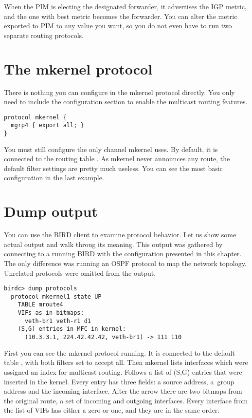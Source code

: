 When the PIM is electing the designated forwarder, it advertises the IGP metric, and
the one with best metric becomes the forwarder. You can alter the metric
exported to PIM to any value you want, so you do not even have to run two
separate routing protocols.

\section{The mkernel protocol}

There is nothing you can configure in the mkernel protocol directly. You only
need to include the configuration section to enable the multicast routing
features.

\begin{lstlisting}
protocol mkernel {
  mgrp4 { export all; }
}
\end{lstlisting}

\noindent You must still configure the only channel mkernel uses. By default, it
is connected to the routing table . As mkernel never announces any
route, the default filter settings are pretty much useless. You can see the
most basic configuration in the last example.

\section{Dump output}
You can use the BIRD client to examine protocol behavior. Let us show some
actual output and walk throug its meaning. This output was gathered by
connecting to a running BIRD with the configuration presented in this chapter.
The only difference was running an OSPF protocol to map the network topology.
Unrelated protocols were omitted from the output.

\begin{lstlisting}
birdc> dump protocols
  protocol mkernel1 state UP
    TABLE mroute4
    VIFs as in bitmaps:
      veth-br1 veth-r1 d1
    (S,G) entries in MFC in kernel:
      (10.3.3.1, 224.42.42.42, veth-br1) -> 111 110
\end{lstlisting}

\noindent First you can see the mkernel protocol running. It is connected to the default
table , with both filters set to accept all. Then mkernel lists
interfaces which were assigned an index for multicast routing. Follows a list
of (S,G) entries that were inserted in the kernel. Every entry has three
fields: a source address, a~group address and the incoming interface. After the
arrow there are two bitmaps from the original route, a set of incoming and
outgoing interfaces. Every interface from the list of VIFs has either a zero or
one, and they are in the same order.

